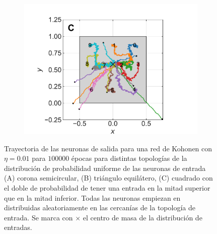 \documentclass[11pt,twocolumn,twoside]{opticajnl}
\begin{document}
\begin{figure}[h]
\begin{subfigure}[b]{\linewidth}
            \includegraphics[width=\textwidth]{Figuras/cuad_pesos_sigma_0.1_epochs_100000_lr_0.01_disp.pdf}
         \end{subfigure}
    \caption{Trayectoria de las neuronas de salida para una red de Kohonen con $\eta=0.01$ para $100000$ épocas para distintas topologías de la distribución de probabilidad uniforme de las neuronas de entrada (A) corona semicircular, (B) triángulo equilátero, (C) cuadrado con el doble de probabilidad de tener una entrada en la mitad superior que en la mitad inferior. Todas las neuronas empiezan en distribuidas aleatoriamente en las cercanías de la topología de entrada. Se marca con $\times$ el centro de masa de la distribución de entradas.} 
    \label{fig:Kohonen_sigma_adp_dist}
\end{figure}











%





\clearpage
\end{document}
